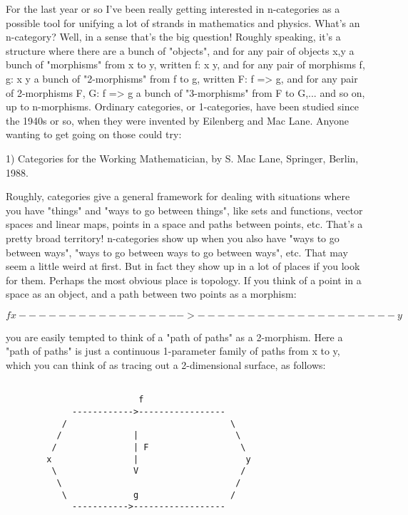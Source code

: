 

For the last year or so I've been really getting interested in
n-categories as a possible tool for unifying a lot of strands
in mathematics and physics.  What's an n-category?  Well, in a
sense that's the big question!  Roughly speaking, it's a structure
where there are a bunch of "objects", and for any pair of objects x,y 
a bunch of "morphisms" from x to y, written f: x \to  y, and for
any pair of morphisms f, g: x \to  y a bunch of "2-morphisms"
from f to g, written F: f => g, and for any pair of 2-morphisms
F, G: f => g a bunch of "3-morphisms" from F to G,... and so on,
up to n-morphisms.  Ordinary categories, or 1-categories, have
been studied since the 1940s or so, when they were invented by 
Eilenberg and Mac Lane.  Anyone wanting to get going on those could try:

1) Categories for the Working Mathematician, by S. Mac Lane,
Springer, Berlin, 1988.

Roughly, categories give a general framework for
dealing with situations where you have "things" and "ways to
go between things", like sets and functions, vector spaces
and linear maps, points in a space and paths between points, etc.
That's a pretty broad territory!  n-categories show up when you
also have "ways to go between ways", "ways to go between ways
to go between ways", etc.  That may seem a little weird at first.
But in fact they show up in a lot of places if you look for them.
Perhaps the most obvious place is topology.  If you think of a
point in a space as an object, and a path between two points as
a morphism:



$$

                            f
         x ----------------->-------------------- y
$$
    
you are easily tempted to think of a "path of paths" as a 2-morphism.
Here a "path of paths" is just a continuous 1-parameter family of
paths from x to y, which you can think of as tracing out a 2-dimensional
surface, as follows:


\begin{verbatim}

                          f
             ------------>-----------------
           /                                \
          /              |                   \
         /               | F                  \
        x                |                     y
         \               V                    /
          \                                  /
           \             g                  /
             ----------->------------------  

\end{verbatim}
    

